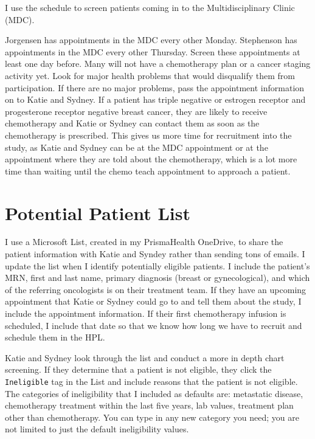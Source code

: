 \documentclass[
]{book}
\begin{document}
I use the schedule to screen patients coming in to the Multidisciplinary Clinic (MDC).

Jorgensen has appointments in the MDC every other Monday. Stephenson has appointments in the MDC every other Thursday. Screen these appointments at least one day before. Many will not have a chemotherapy plan or a cancer staging activity yet. Look for major health problems that would disqualify them from participation. If there are no major problems, pass the appointment information on to Katie and Sydney. If a patient has triple negative or estrogen receptor and progesterone receptor negative breast cancer, they are likely to receive chemotherapy and Katie or Sydney can contact them as soon as the chemotherapy is prescribed. This gives us more time for recruitment into the study, as Katie and Sydney can be at the MDC appointment or at the appointment where they are told about the chemotherapy, which is a lot more time than waiting until the chemo teach appointment to approach a patient.

\hypertarget{potential-patient-list}{%
\section{Potential Patient List}\label{potential-patient-list}}

I use a Microsoft List, created in my PrismaHealth OneDrive, to share the patient information with Katie and Syndey rather than sending tons of emails. I update the list when I identify potentially eligible patients. I include the patient's MRN, first and last name, primary diagnosis (breast or gynecological), and which of the referring oncologists is on their treatment team. If they have an upcoming appointment that Katie or Sydney could go to and tell them about the study, I include the appointment information. If their first chemotherapy infusion is scheduled, I include that date so that we know how long we have to recruit and schedule them in the HPL.

Katie and Sydney look through the list and conduct a more in depth chart screening. If they determine that a patient is not eligible, they click the \texttt{Ineligible} tag in the List and include reasons that the patient is not eligible. The categories of ineligibility that I included as defaults are: metastatic disease, chemotherapy treatment within the last five years, lab values, treatment plan other than chemotherapy. You can type in any new category you need; you are not limited to just the default ineligibility values.
\end{document}
